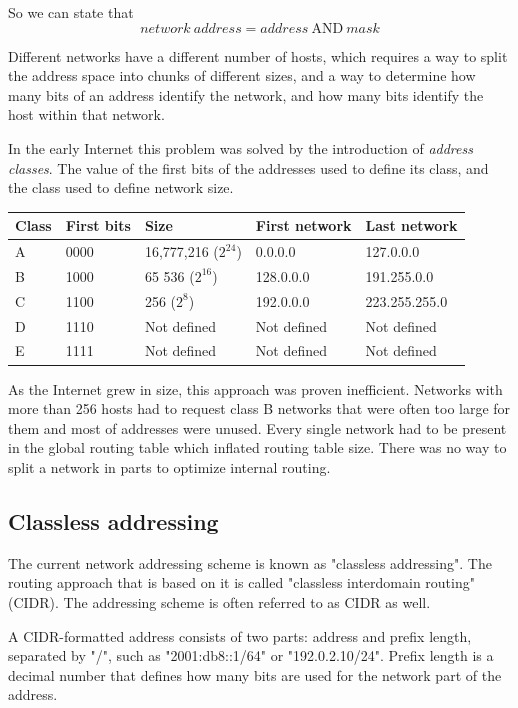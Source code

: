 So we can state that 
\begin{equation}
  network\ address = address\ \mathrm{AND}\ mask
\end{equation}

Different networks have a different number of hosts, which requires a way to split the address space into chunks of
different sizes, and a way to determine how many bits of an address identify the network, and how many bits
identify the host within that network.

In the early Internet this problem was solved by the introduction of \emph{address classes}. The value of the first
bits of the addresses used to define its class, and the class used to define network size.

\begin{tabular}{|l|l|l|l|l|}
\hline
Class & First bits & Size & First network & Last network \\
\hline
A & 0000 & 16,777,216 ($2^{24}$) & 0.0.0.0 & 127.0.0.0 \\
\hline
B & 1000 & 65 536 ($2^{16}$) & 128.0.0.0 & 191.255.0.0 \\
\hline
C & 1100 & 256 ($2^{8}$) & 192.0.0.0 & 223.255.255.0 \\
\hline
D & 1110 & Not defined & Not defined & Not defined \\
\hline
E & 1111 & Not defined & Not defined & Not defined \\
\hline
\end{tabular}

As the Internet grew in size, this approach was proven inefficient. Networks with more than 256 hosts had to
request class B networks that were often too large for them and most of addresses were unused. Every single
network had to be present in the global routing table which inflated routing table size. There was no way
to split a network in parts to optimize internal routing.

\subsection{Classless addressing}

The current network addressing scheme is known as "classless addressing". The routing approach that is based on it
is called "classless interdomain routing" (CIDR). The addressing scheme is often referred to as CIDR as well.

A CIDR-formatted address consists of two parts: address and prefix length, separated by "/", such as
"2001:db8::1/64" or "192.0.2.10/24". Prefix length is a decimal number that defines how many bits are used
for the network part of the address.




